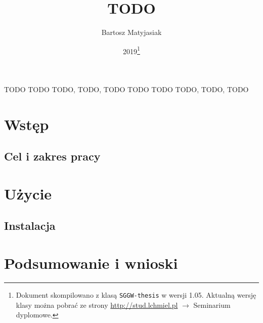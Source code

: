 \documentclass{SGGW-thesis}
\title{TODO}
\author{Bartosz Matyjasiak}
\date{2019\footnote{Dokument skompilowano z klasą {\tt SGGW-thesis} w wersji 1.05. Aktualną wersję klasy można pobrać ze strony \url{http://stud.lchmiel.pl} $\rightarrow$ Seminarium dyplomowe.}}
\begin{document}
\maketitle
\statementpage
\abstractpage
{TODO}
{TODO}
{TODO, TODO, TODO}
{TODO}
{TODO}
{TODO, TODO, TODO}


{
  \doublespacing
  \tableofcontents
}

\startchapterfromoddpage %


\chapter{Wstęp}


\section{Cel i zakres pracy}


\chapter{Użycie}


\section{Instalacja}


\chapter{Podsumowanie i wnioski}


\begin{thebibliography}{9}

\end{thebibliography}

\beforelastpage
\end{document}

